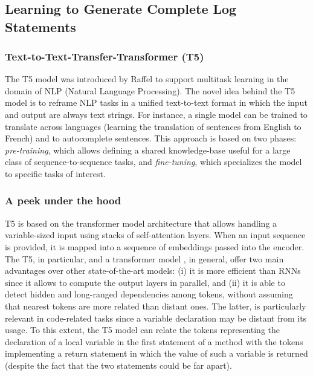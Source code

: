 \section{\approach} \label{sec:t5}

\subsection{Learning to Generate Complete Log Statements}

\subsubsection{Text-to-Text-Transfer-Transformer (T5)}


The T5 model was introduced by Raffel \etal \cite{raffel2019exploring} to support multitask learning in the domain of NLP (Natural Language Processing). The novel idea behind the T5 model is to reframe NLP tasks in a unified text-to-text format in which the input and output are always text strings. For instance, a single model can be trained to translate across languages  (\eg learning the translation of sentences from English to French) and to autocomplete sentences. This approach is based on two phases: \textit{pre-training}, which allows defining a shared knowledge-base useful for a large class of sequence-to-sequence tasks, and \textit{fine-tuning}, which specializes the model to specific tasks of interest. 

\subsubsection{A peek under the hood}
T5 is based on the transformer model architecture that allows handling a variable-sized input using stacks of self-attention layers. When an input sequence is provided, it is mapped into a sequence of embeddings passed into the encoder. The T5, in particular, and a transformer model \cite{vaswani2017attention}, in general, offer two main advantages over other state-of-the-art models: (i) it is more efficient than RNNs since it allows to compute the output layers in parallel, and (ii) it is able to detect hidden and long-ranged dependencies among tokens, without assuming that nearest tokens are more related than distant ones. The latter, is particularly relevant in code-related tasks since a variable declaration may be distant from its usage. To this extent, the T5 model can relate the tokens representing the declaration of a local variable in the first statement of a method with the tokens implementing a return statement in which the value of such a variable is returned (despite the fact that the two statements could be far apart). 

